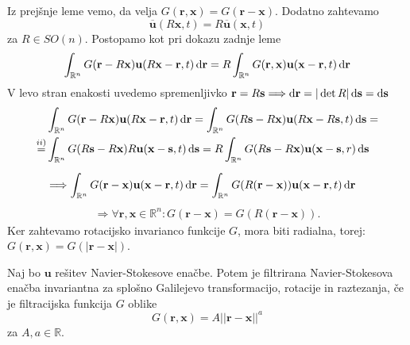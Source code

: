 \documentclass[mat2, tisk]{fmfdelo}
\newcommand{\R}{\mathbb R}
\newcommand{\bd}{\textbf}
\begin{document}
\begin{dokaz}
Iz prejšnje leme vemo, da velja $G(\bd{r}, \bd{x}) = G(\bd{r} - \bd{x})$. Dodatno zahtevamo 
$$
\overline{\bd{u}}(R\bd{x}, t) = R \overline{\bd{u}}(\bd{x}, t)
$$
za $R\in SO(n)$. Postopamo kot pri dokazu zadnje leme 
$$\int_{\R^n} G(\bd{r} - R\bd{x}) \bd{u}(R\bd{x} - \bd{r}, t)\dif \bd{r} = R \int_{\R^n} G(\bd{r}, \bd{x}) \bd{u}(\bd{x} - \bd{r}, t)\dif \bd{r}$$
V levo stran enakosti uvedemo spremenljivko $\bd{r} = R \bd{s} \Longrightarrow \dif \bd{r} = |\det{R}| \dif \bd{s} = \dif \bd{s}$
\begin{align*}
&\int_{\R^n} G(\bd{r} - R\bd{x}) \bd{u}(R\bd{x} - \bd{r}, t)\dif \bd{r} = \int_{\R^n} G(R\bd{s} - R\bd{x}) \bd{u}(R\bd{x} - R\bd{s}, t)\dif \bd{s} = \\
\stackrel{ii)}{=} &\int_{\R^n} G(R\bd{s} - R\bd{x}) R\bd{u}(\bd{x} - \bd{s}, t)\dif \bd{s} = R\int_{\R^n} G(R\bd{s} - R\bd{x}) \bd{u}(\bd{x} - \bd{s}, r)\dif \bd{s}\\[2mm]
&\Longrightarrow \int_{\R^n} G(\bd{r} - \bd{x}) \bd{u}(\bd{x} - \bd{r}, t)\dif \bd{r} = \int_{\R^n} G(R(\bd{r} - \bd{x})) \bd{u}(\bd{x} - \bd{r}, t)\dif \bd{r}
\end{align*}
\begin{align*}
\Longrightarrow \forall \bd{r}, \bd{x}\in \R^n: G(\bd{r} - \bd{x}) = G(R(\bd{r} - \bd{x})).
\end{align*}
Ker zahtevamo rotacijsko invarianco funkcije $G$, mora biti radialna, torej:\\ $G(\bd{r}, \bd{x}) = G(|\bd{r} - \bd{x}|)$.
\end{dokaz}
  
\begin{lema}
Naj bo $\bd{u}$ rešitev Navier-Stokesove enačbe. Potem je filtrirana Navier-Stokesova enačba 
invariantna za splošno Galilejevo transformacijo, rotacije in raztezanja, če je filtracijska funkcija $G$ oblike
$$
G(\bd{r}, \bd{x}) = A||\bd{r} - \bd{x}||^a
$$
za $A, a\in \R$.
\end{lema}
\end{document}
